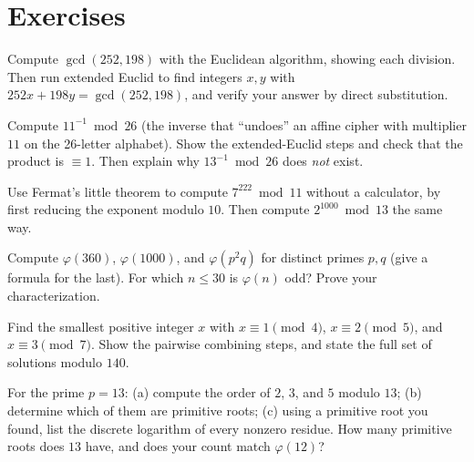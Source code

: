 \section{Exercises}
\label{ch04:exercises}

\begin{exercise}
Compute $\gcd(252, 198)$ with the Euclidean algorithm, showing each division. Then run extended
Euclid to find integers $x, y$ with $252x + 198y = \gcd(252,198)$, and verify your answer by direct
substitution.
\end{exercise}

\begin{exercise}
Compute $11^{-1} \bmod 26$ (the inverse that ``undoes'' an affine cipher with multiplier $11$ on the
26-letter alphabet). Show the extended-Euclid steps and check that the product is $\equiv 1$.
Then explain why $13^{-1} \bmod 26$ does \emph{not} exist.
\end{exercise}

\begin{exercise}
Use Fermat's little theorem to compute $7^{222} \bmod 11$ without a calculator, by first reducing
the exponent modulo $10$. Then compute $2^{1000} \bmod 13$ the same way.
\end{exercise}

\begin{exercise}
Compute $\varphi(360)$, $\varphi(1000)$, and $\varphi(p^2 q)$ for distinct primes $p, q$ (give a
formula for the last). For which $n \le 30$ is $\varphi(n)$ odd? Prove your characterization.
\end{exercise}

\begin{exercise}
Find the smallest positive integer $x$ with $x \equiv 1 \pmod 4$, $x \equiv 2 \pmod 5$, and
$x \equiv 3 \pmod 7$. Show the pairwise combining steps, and state the full set of solutions modulo
$140$.
\end{exercise}

\begin{exercise}
For the prime $p = 13$: (a) compute the order of $2$, $3$, and $5$ modulo $13$; (b) determine which
of them are primitive roots; (c) using a primitive root you found, list the discrete logarithm of
every nonzero residue. How many primitive roots does $13$ have, and does your count match
$\varphi(12)$?
\end{exercise}


